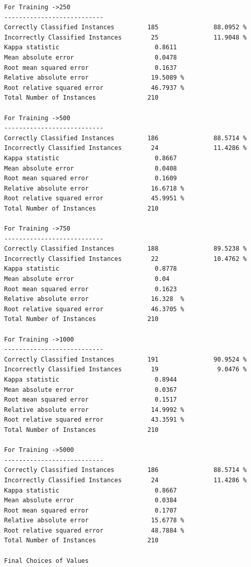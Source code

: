 \documentclass[fontsize=10pt,DIV=14]{scrartcl}
\begin{document}
\begin{itemize}
\begin{verbatim}
For Training ->250 
---------------------------
Correctly Classified Instances         185               88.0952 %
Incorrectly Classified Instances        25               11.9048 %
Kappa statistic                          0.8611
Mean absolute error                      0.0478
Root mean squared error                  0.1637
Relative absolute error                 19.5089 %
Root relative squared error             46.7937 %
Total Number of Instances              210     

For Training ->500 
---------------------------
Correctly Classified Instances         186               88.5714 %
Incorrectly Classified Instances        24               11.4286 %
Kappa statistic                          0.8667
Mean absolute error                      0.0408
Root mean squared error                  0.1609
Relative absolute error                 16.6718 %
Root relative squared error             45.9951 %
Total Number of Instances              210     

For Training ->750 
---------------------------
Correctly Classified Instances         188               89.5238 %
Incorrectly Classified Instances        22               10.4762 %
Kappa statistic                          0.8778
Mean absolute error                      0.04  
Root mean squared error                  0.1623
Relative absolute error                 16.328  %
Root relative squared error             46.3705 %
Total Number of Instances              210     

For Training ->1000 
---------------------------
Correctly Classified Instances         191               90.9524 %
Incorrectly Classified Instances        19                9.0476 %
Kappa statistic                          0.8944
Mean absolute error                      0.0367
Root mean squared error                  0.1517
Relative absolute error                 14.9992 %
Root relative squared error             43.3591 %
Total Number of Instances              210     

For Training ->5000 
---------------------------
Correctly Classified Instances         186               88.5714 %
Incorrectly Classified Instances        24               11.4286 %
Kappa statistic                          0.8667
Mean absolute error                      0.0384
Root mean squared error                  0.1707
Relative absolute error                 15.6778 %
Root relative squared error             48.7884 %
Total Number of Instances              210     

Final Choices of Values 


\end{verbatim}
\end{itemize}
\end{document}
